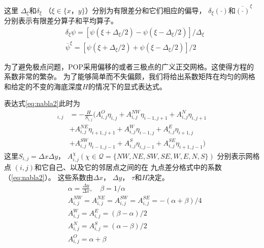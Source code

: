 这里 $\Delta_\xi$和$\delta_\xi$  （$\xi \in \{x， y\} $）分别为有限差分和它们相应的偏导，  $\delta_\xi (\cdot) $和$\overline{(\cdot)}^\xi $ 分别表示有限差分算子和平均算子。  
\begin{align}
&\delta_\xi \psi = [\psi (\xi+\Delta_\xi/2) -\psi(\xi-\Delta_\xi/2)]/\Delta_\xi \\
&\overline{\psi}^\xi  =[\psi (\xi+\Delta_\xi/2) +\psi(\xi-\Delta_\xi/2)]/2
\end{align}


为了避免极点问题，POP采用偏移的或者三极点的广义正交网格。这使得方程的系数非常的繁杂。
为了能够简单而不失偏颇，我们将给出系数矩阵在均匀的网格和给定的不变的海底深度$H$的情况下的显式表达式。
 

表达式\ref{eq:nabla2}此时为
\begin{align}
 [\nabla\cdot H \nabla \eta]_{i,j}&= -\frac{H}{S_{i,j}}(A_{i,j}^O\eta_{i,j}+A_{i,j}^{NW}\eta_{i-1,j+1}+A_{i,j}^N\eta_{i,j+1} \nonumber\\
 &+A_{i,j}^{NE}\eta_{i+1,j+1}+A_{i,j}^W\eta_{i-1,j} +A_{i,j}^E\eta_{i+1,j} \nonumber\\
& +A_{i,j}^{SW}\eta_{i-1,j-1} +A_{i,j}^S\eta_{i,j-1}+ A_{i,j}^{SE}\eta_{i+1,j-1})
\end{align}
这里$S_{i,j}  = \Delta x\Delta y$， $A_{i,j}^{\chi } ( \chi \in \mathcal{Q} = \{NW,NE, SW, SE, W, E, N, S\})$ 分别表示网格点 $(i,j)$和它自己、以及它的邻居点之间的在 九点差分格式中的系数（\ref{eq:nabla2}）。 这些系数由$\Delta x$， $\Delta y$， $\tau$和$H$决定。
\begin{equation} \label{defineA}
\begin{aligned}
&\alpha  = \frac{ \Delta y}{ \Delta x }, \quad \beta  = 1/\alpha \\
&A_{i,j}^{NW} = A_{i,j}^{NE} =A_{i,j}^{SW} = A_{i,j}^{SE} = - (\alpha  +  \beta  )/4 \\
&A_{i,j}^{W} = A_{i,j}^{E} = (  \beta  -\alpha  )/2 \\
&A_{i,j}^{N} = A_{i,j}^{S} = (\alpha  -\beta )/2 \\
&A_{i,j}^{O} =   \alpha   +\beta  \\
\end{aligned}
\end{equation}


